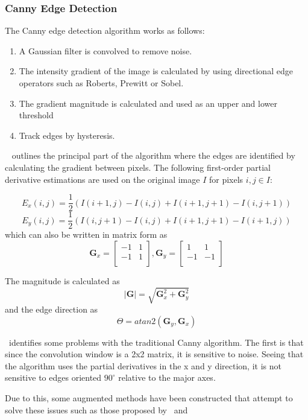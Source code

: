 \documentclass[a4paper, 12pt]{report}
\begin{document}
\subsubsection{Canny Edge Detection}
The Canny edge detection algorithm works as follows:
\begin{enumerate}
    \item A Gaussian filter is convolved to remove noise.
    \item The intensity gradient of the image is calculated by using directional edge
          operators such as Roberts, Prewitt or Sobel.
    \item The gradient magnitude is calculated and used as an upper and lower threshold
    \item Track edges by hysteresis.
\end{enumerate}

~\cite{rong2014improved} outlines the principal part of the algorithm where the edges are identified by calculating the gradient between pixels. The following first-order partial derivative estimations are used on the original image \(I\) for pixels \(i,j \in I\):

\[E_x(i,j)=\frac{1}{2}(I(i+1,j)-I(i,j)+I(i+1,j+1)-I(i,j+1))\]
\[E_y(i,j)=\frac{1}{2}(I(i,j+1)-I(i,j)+I(i+1,j+1)-I(i+1,j))\]
which can also be written in matrix form as
\[\mathbf{G}_x=\begin{bmatrix}
        -1 & 1 \\
        -1 & 1 \\
    \end{bmatrix},
    \mathbf{G}_y=\begin{bmatrix}
        1  & 1  \\
        -1 & -1 \\
    \end{bmatrix}
\]

The magnitude is calculated as
\[|\mathbf{G}|=\sqrt{\mathbf{G}_x^2+\mathbf{G}_y^2}\]
and the edge direction as
\[\Theta=atan2(\mathbf{G}_y,\mathbf{G}_x)\]

~\cite{rong2014improved}identifies some problems with the traditional Canny algorithm. The first is that since the convolution window is a 2x2 matrix, it is sensitive to noise. Seeing that the algorithm uses the partial derivatives in the x and y direction, it is not sensitive to edges oriented $90^{\circ}$ relative to the major axes.\par

Due to this, some augmented methods have been constructed that attempt to solve
these issues such as those proposed by~\cite{rong2014improved}
and~\cite{xuan2017improved}
\end{document}
